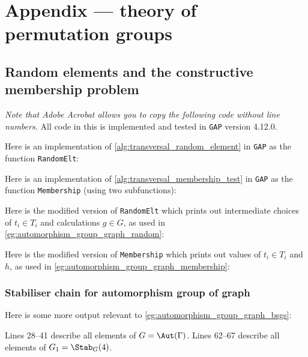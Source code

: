 \chapter{Appendix --- theory of permutation groups}%

\section{Random elements and the constructive membership problem}

\textit{Note that Adobe Acrobat allows you to copy the following code without line numbers.} All code in this \thesis{} is implemented and tested in \texttt{GAP} version 4.12.0.

Here is an implementation of \autoref{alg:transversal_random_element} in \texttt{GAP} as the function \texttt{RandomElt}:\label{app:transversal_random_element}



Here is an implementation of \autoref{alg:transversal_membership_test} in \texttt{GAP} as the function \texttt{Membership} (using two subfunctions):\label{app:transversal_membership_test}



Here is the modified version of \texttt{RandomElt} which prints out intermediate choices of $t_i \in T_i$ and calculations $g \in G$, as used in \autoref{eg:automorphism_group_graph_random}:



Here is the modified version of \texttt{Membership} which prints out values of $t_i \in T_i$ and $h$, as used in \autoref{eg:automorphism_group_graph_membership}:



\subsection{Stabiliser chain for automorphism group of graph}

Here is some more output relevant to \autoref{eg:automorphism_group_graph_bsgs}:\label{app:automorphism_group_graph_bsgs}



Lines 28--41 describe all elements of $G = \Aut(\Gamma)$. Lines 62--67 describe all elements of $G_1 = \Stab_G(4)$.

